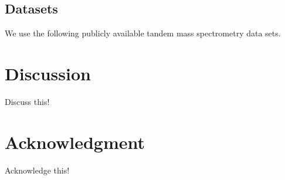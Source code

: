 \documentclass{bioinfo}
\begin{document}
\subsection*{Datasets}
We use the following publicly available tandem mass spectrometry data sets.

\section{Discussion}
Discuss this!

\section*{Acknowledgment}

Acknowledge this!





 
\end{document}
